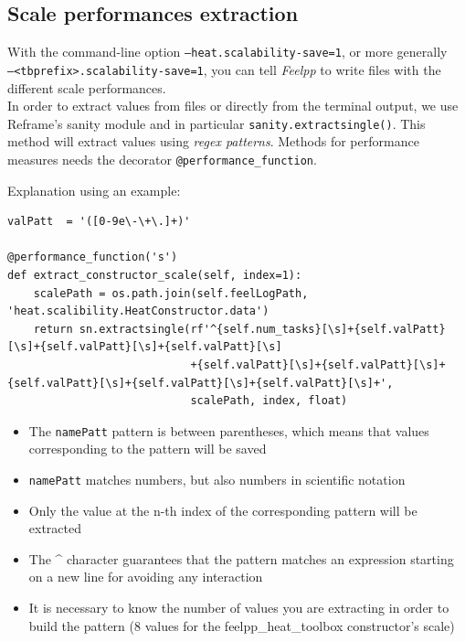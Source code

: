 \documentclass[12pt]{article}
\begin{document}
\subsection{Scale performances extraction}
With the command-line option \small{\texttt{--heat.scalability-save=1}}, or more generally \\ \small{\texttt{--<tbprefix>.scalability-save=1}}, you can tell \textit{Feelpp} to write files with the different scale performances. \\
In order to extract values from files or directly from the terminal output, we use Reframe's sanity module and in particular \texttt{sanity.extractsingle()}.
This method will extract values using \textit{regex patterns}. Methods for performance measures needs the decorator \small{\texttt{@performance\_function}}.

Explanation using an example:
\begin{scriptsize}
\begin{verbatim}
valPatt  = '([0-9e\-\+\.]+)'

@performance_function('s')
def extract_constructor_scale(self, index=1):
    scalePath = os.path.join(self.feelLogPath, 'heat.scalibility.HeatConstructor.data')
    return sn.extractsingle(rf'^{self.num_tasks}[\s]+{self.valPatt}[\s]+{self.valPatt}[\s]+{self.valPatt}[\s]
                            +{self.valPatt}[\s]+{self.valPatt}[\s]+{self.valPatt}[\s]+{self.valPatt}[\s]+{self.valPatt}[\s]+',
                            scalePath, index, float)
\end{verbatim}
\end{scriptsize}

\begin{itemize}
    \item The \small{\texttt{namePatt}} pattern is between parentheses, which means that values corresponding to the pattern will be saved
    \item \small{\texttt{namePatt}} matches numbers, but also numbers in scientific notation
    \item Only the value at the n-th index of the corresponding pattern will be extracted
    \item The \^{} character guarantees that the pattern matches an expression starting on a new line for avoiding any interaction
    \item It is necessary to know the number of values you are extracting in order to build the pattern (8 values for the feelpp\_heat\_toolbox constructor's scale)
\end{itemize}
\end{document}
